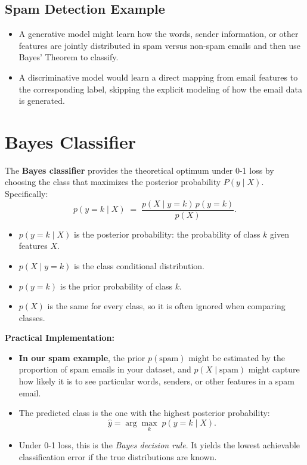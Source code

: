 \documentclass[10pt]{article}
\begin{document}
\subsection{Spam Detection Example}
\begin{itemize}
    \item A generative model might learn how the words, sender information, or other features are jointly distributed in spam versus non-spam emails and then use Bayes' Theorem to classify.
    \item A discriminative model would learn a direct mapping from email features to the corresponding label, skipping the explicit modeling of how the email data is generated.
\end{itemize}

\section{Bayes Classifier}

The \textbf{Bayes classifier} provides the theoretical optimum under 0-1 loss by choosing the class that maximizes the posterior probability \(P(y \mid X)\). Specifically:
\[
p(y=k \mid X) \;=\; \frac{p(X \mid y=k)\,p(y=k)}{p(X)}.
\]
\begin{itemize}
  \item \(p(y = k \mid X)\) is the posterior probability: the probability of class \(k\) given features \(X\).
  \item \(p(X \mid y = k)\) is the class conditional distribution.
  \item \(p(y = k)\) is the prior probability of class \(k\).
  \item \(p(X)\) is the same for every class, so it is often ignored when comparing classes.
\end{itemize}

\noindent
\textbf{Practical Implementation:}
\begin{itemize}
  \item \textbf{In our spam example}, the prior \(p(\text{spam})\) might be estimated by the proportion of spam emails in your dataset, and \(p(X \mid \text{spam})\) might capture how likely it is to see particular words, senders, or other features in a spam email.
  \item The predicted class is the one with the highest posterior probability:
  \[
  \hat{y} = \arg\max_{k} \; p(y = k \mid X).
  \]
  \item Under 0-1 loss, this is the \emph{Bayes decision rule}. It yields the lowest achievable classification error if the true distributions are known.
\end{itemize}
\end{document}
